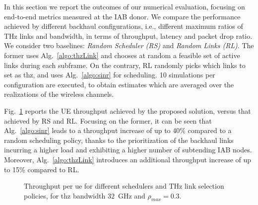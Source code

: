 
In this section we report the outcomes of our numerical evaluation, focusing on end-to-end metrics measured at the IAB donor. We compare the performance achieved by different backhaul configurations, i.e., different maximum ratios of THz links and bandwidth, in terms of throughput, latency and packet drop ratio. We consider two baselines: \textit{Random Scheduler (RS)} and \textit{Random Links (RL)}. The former uses Alg.~\ref{algo:thzLink} and chooses at random a feasible set of active links during each subframe. On the contrary, RL randomly picks which links to set as \gls{thz}, and uses Alg.~\ref{algo:sinr} for scheduling. 10 simulations per configuration are executed, to obtain estimates which are averaged over the realizations of the wireless channels.

Fig.~\ref{fig:ThroughputPerDifferAlg} reports the UE throughput achieved by the proposed solution, versus that achieved by RS and RL. Focusing on the former, it can be seen that Alg.~\ref{algo:sinr} leads to a throughput increase of up to 40\% compared to a random scheduling policy, thanks to the prioritization of the backhaul links incurring a higher load and exhibiting a higher number of subtending IAB nodes. 
Moreover, Alg.~\ref{algo:thzLink} introduces an additional throughput increase of up to 15\% compared to RL.
\begin{figure}
    \centering
    \setlength{}
    \setlength{}
    
    \caption{Throughput per \gls{ue} for different schedulers and THz link selection policies, for \gls{thz} bandwidth $32$~GHz and $\rho_{max} = 0.3$.} 
    \label{fig:ThroughputPerDifferAlg}
\end{figure}

